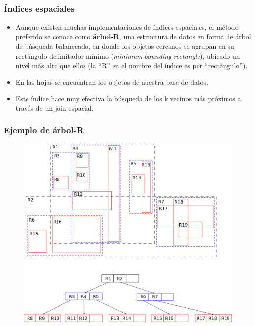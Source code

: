 \begin{frame}
\frametitle{Índices espaciales}
\begin{itemize}
	\item	Aunque existen muchas implementaciones de índices espaciales,
		el método preferido se conoce como {\bf árbol-R}, una estructura
		de datos en forma de árbol de búsqueda balanceado, en donde los
		objetos cercanos se agrupan en su rectángulo delimitador mínimo
		({\it minimum bounding rectangle}), ubicado un nivel más alto que
		ellos (la ``R'' en el nombre del índice es por ``rectángulo'').
		\pause

	\item	En las hojas se encuentran los objetos de nuestra base de datos. \pause

	\item	Este índice hace muy efectiva la búsqueda de los k vecinos más próximos
		a través de un join espacial.
\end{itemize}
\end{frame}

\begin{frame}
\frametitle{Ejemplo de árbol-R}

	\begin{figure}
	\includegraphics[scale=0.125]{R-tree}
	\end{figure}
\end{frame}

